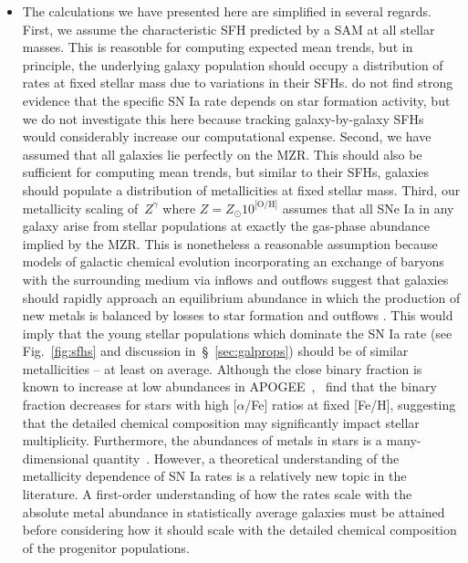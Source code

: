 \documentclass[ms.tex]{subfiles}
\begin{document}
\begin{itemize}
	\item The calculations we have presented here are simplified in several
	regards.
	First, we assume the characteristic SFH predicted by a SAM at all stellar
	masses.
	This is reasonble for computing expected mean trends, but in principle, the
	underlying galaxy population should occupy a distribution of rates at
	fixed stellar mass due to variations in their SFHs.
	\citet{Brown2019} do not find strong evidence that the specific SN Ia rate
	depends on star formation activity, but we do not investigate this here
	because tracking galaxy-by-galaxy SFHs would considerably increase our
	computational expense.
	Second, we have assumed that all galaxies lie perfectly on the MZR.
	This should also be sufficient for computing mean trends, but similar to
	their SFHs, galaxies should populate a distribution of metallicities at
	fixed stellar mass.
	Third, our metallicity scaling of~$Z^{\gamma}$ where
	$Z = Z_\odot 10^\text{[O/H]}$ assumes that all SNe Ia in any galaxy arise
	from stellar populations at exactly the gas-phase abundance implied by the
	MZR.
	This is nonetheless a reasonable assumption because models of galactic
	chemical evolution incorporating an exchange of baryons with the
	surrounding medium via inflows and outflows suggest that galaxies should
	rapidly approach an equilibrium abundance in which the production of
	new metals is balanced by losses to star formation and outflows
	\citep{Larson1972, Weinberg2017}.
	This would imply that the young stellar populations which dominate the SN
	Ia rate (see Fig.~\ref{fig:sfhs} and discussion in~\S~\ref{sec:galprops})
	should be of similar metallicities -- at least on average.
	Although the close binary fraction is known to increase at low abundances
	in APOGEE~\citep{Badenes2018, Moe2019},~\citet{Mazzola2020} find that the
	binary fraction decreases for stars with high [$\alpha$/Fe] ratios at
	fixed [Fe/H], suggesting that the detailed chemical composition may
	significantly impact stellar multiplicity.
	Furthermore, the abundances of metals in stars is a many-dimensional
	quantity~\citep[e.g.][]{Ting2022}.
	However, a theoretical understanding of the metallicity dependence of SN Ia
	rates is a relatively new topic in the literature.
	A first-order understanding of how the rates scale with the absolute metal
	abundance in statistically average galaxies must be attained before
	considering how it should scale with the detailed chemical composition of
	the progenitor populations.

\end{itemize}
\end{document}
